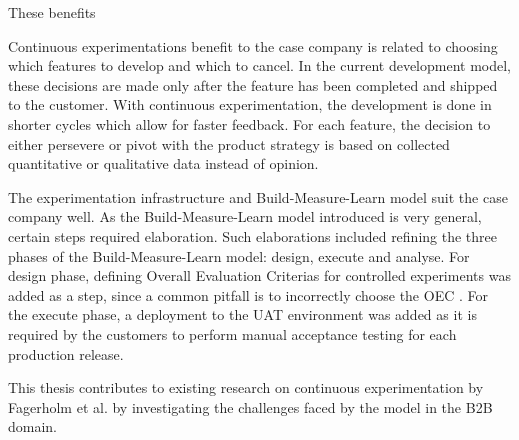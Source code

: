 \documentclass[english]{tktltiki2}
\theoremstyle{definition}
\theoremstyle{remark}
\begin{document}


These benefits 


Continuous experimentations benefit to the case company is related to choosing which features to develop and which to cancel. In the current development model, these decisions are made only after the feature has been completed and shipped to the customer. With continuous experimentation, the development is done in shorter cycles which allow for faster feedback. For each feature, the decision to either persevere or pivot with the product strategy is based on collected quantitative or qualitative data instead of opinion.






The experimentation infrastructure and Build-Measure-Learn model \cite{fagerholm2014building} suit the case company well. As the Build-Measure-Learn model introduced is very general, certain steps required elaboration. Such elaborations included refining the three phases of the Build-Measure-Learn model: design, execute and analyse. For design phase, defining Overall Evaluation Criterias for controlled experiments was added as a step, since a common pitfall is to incorrectly choose the OEC \cite{crook2009seven}. For the execute phase, a deployment to the UAT environment was added as it is required by the customers to perform manual acceptance testing for each production release. 

This thesis contributes to existing research on continuous experimentation by Fagerholm et al. \cite{fagerholm2014building} by investigating the challenges faced by the model in the B2B domain. 
\end{document}
